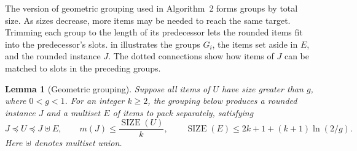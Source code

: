 \documentclass[11pt,a4paper,onecolumn]{article}
\theoremstyle{plain}
\newtheorem{lemma}[theorem]{Lemma}
\theoremstyle{definition}
\theoremstyle{remark}
\DeclareMathOperator{\SIZE}{SIZE}
\begin{document}
The version of geometric grouping used in Algorithm~2 forms groups by
total size. As sizes decrease, more items may be needed to reach the
same target. Trimming each group to the length of its predecessor
lets the rounded items fit into the predecessor's slots.
 in 
illustrates the groups $G_i$, the items set aside in $E$, and the
rounded instance $J$. The dotted connections show how items of $J$
can be matched to slots in the preceding groups.

\begin{lemma}[Geometric grouping]\label{lem:kk-grouping}
Suppose all items of $U$ have size greater than $g$, where $0<g<1$.
For an integer $k\ge 2$, the grouping below produces a rounded instance
$J$ and a multiset $E$ of items to pack separately, satisfying
\[
  J\preceq U\preceq J\uplus E,\qquad
  m(J)\le \frac{\SIZE(U)}{k},\qquad
  \SIZE(E)\le 2k+1+(k+1)\ln(2/g).
\]
Here $\uplus$ denotes multiset union.
\end{lemma}
\end{document}
